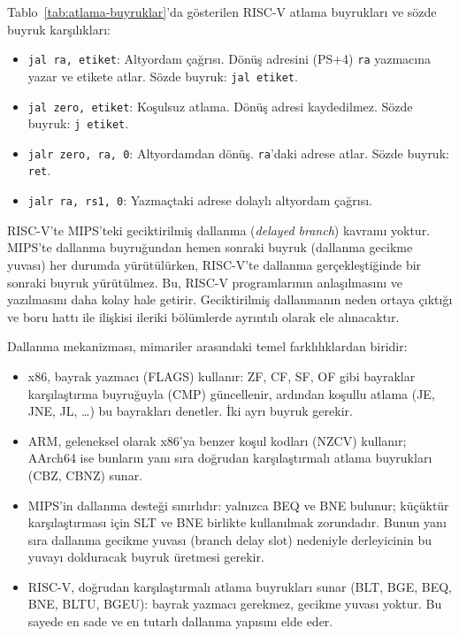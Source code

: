 Tablo~\ref{tab:atlama-buyruklar}'da gösterilen RISC-V atlama buyrukları ve sözde buyruk karşılıkları:
\begin{itemize}
\item \texttt{jal ra, etiket}: Altyordam çağrısı. Dönüş adresini (PS+4) \texttt{ra} yazmacına yazar ve etikete atlar. Sözde buyruk: \texttt{jal etiket}.
\item \texttt{jal zero, etiket}: Koşulsuz atlama. Dönüş adresi kaydedilmez. Sözde buyruk: \texttt{j etiket}.
\item \texttt{jalr zero, ra, 0}: Altyordamdan dönüş. \texttt{ra}'daki adrese atlar. Sözde buyruk: \texttt{ret}.
\item \texttt{jalr ra, rs1, 0}: Yazmaçtaki adrese dolaylı altyordam çağrısı.
\end{itemize}

\begin{bilginot}
RISC-V'te MIPS'teki geciktirilmiş dallanma (\textit{delayed branch}) kavramı yoktur. MIPS'te dallanma buyruğundan hemen sonraki buyruk (dallanma gecikme yuvası) her durumda yürütülürken, RISC-V'te dallanma gerçekleştiğinde bir sonraki buyruk yürütülmez. Bu, RISC-V programlarının anlaşılmasını ve yazılmasını daha kolay hale getirir. Geciktirilmiş dallanmanın neden ortaya çıktığı ve boru hattı ile ilişkisi ileriki bölümlerde ayrıntılı olarak ele alınacaktır.
\end{bilginot}

\begin{karsilastirma}
Dallanma mekanizması, mimariler arasındaki temel farklılıklardan biridir:
\begin{itemize}
  \item x86, bayrak yazmacı (FLAGS) kullanır: ZF, CF, SF, OF gibi bayraklar karşılaştırma buyruğuyla (CMP) güncellenir, ardından koşullu atlama (JE, JNE, JL, \ldots) bu bayrakları denetler. İki ayrı buyruk gerekir.
  \item ARM, geleneksel olarak x86'ya benzer koşul kodları (NZCV) kullanır; AArch64 ise bunların yanı sıra doğrudan karşılaştırmalı atlama buyrukları (CBZ, CBNZ) sunar.
  \item MIPS'in dallanma desteği sınırlıdır: yalnızca BEQ ve BNE bulunur; küçüktür karşılaştırması için SLT ve BNE birlikte kullanılmak zorundadır. Bunun yanı sıra dallanma gecikme yuvası (branch delay slot) nedeniyle derleyicinin bu yuvayı dolduracak buyruk üretmesi gerekir.
  \item RISC-V, doğrudan karşılaştırmalı atlama buyrukları sunar (BLT, BGE, BEQ, BNE, BLTU, BGEU): bayrak yazmacı gerekmez, gecikme yuvası yoktur. Bu sayede en sade ve en tutarlı dallanma yapısını elde eder.
\end{itemize}
\end{karsilastirma}

